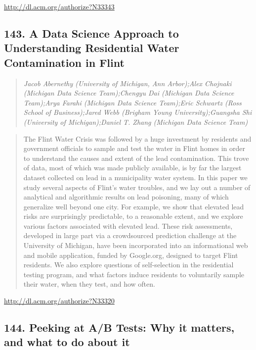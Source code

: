 \documentclass{article}
\begin{document}
\href{http://dl.acm.org/authorize?N33343}{http://dl.acm.org/authorize?N33343}

\subsection{143. A Data Science Approach to Understanding Residential Water Contamination in Flint}

\begin{quote}
\footnotesize{\textit{Jacob Abernethy (University of Michigan, Ann Arbor);Alex Chojnaki (Michigan Data Science Team);Chengyu Dai (Michigan Data Science Team);Arya Farahi (Michigan Data Science Team);Eric Schwartz (Ross School of Business);Jared Webb (Brigham Young University);Guangsha Shi (University of Michigan);Daniel T. Zhang (Michigan Data Science Team)}}

\end{quote}

\begin{quote}
The Flint Water Crisis was followed by a huge investment by residents and government officials to sample and test the water in Flint homes in order to understand the causes and extent of the lead contamination. This trove of data, most of which was made publicly available, is by far the largest dataset collected on lead in a municipality water system. In this paper we study several aspects of Flint’s water troubles, and we lay out a number of analytical and algorithmic results on lead poisoning, many of which generalize well beyond one city. For example, we show that elevated lead risks are surprisingly predictable, to a reasonable extent, and we explore various factors associated with elevated lead. These risk assessments, developed in large part via a crowdsourced prediction challenge at the University of Michigan, have been incorporated into an informational web and mobile application, funded by Google.org, designed to target Flint residents. We also explore questions of self-selection in the residential testing program, and what factors induce residents to voluntarily sample their water, when they test, and how often.
\end{quote}

\href{http://dl.acm.org/authorize?N33320}{http://dl.acm.org/authorize?N33320}

\subsection{144. Peeking at A/B Tests: Why it matters, and what to do about it}
\end{document}
